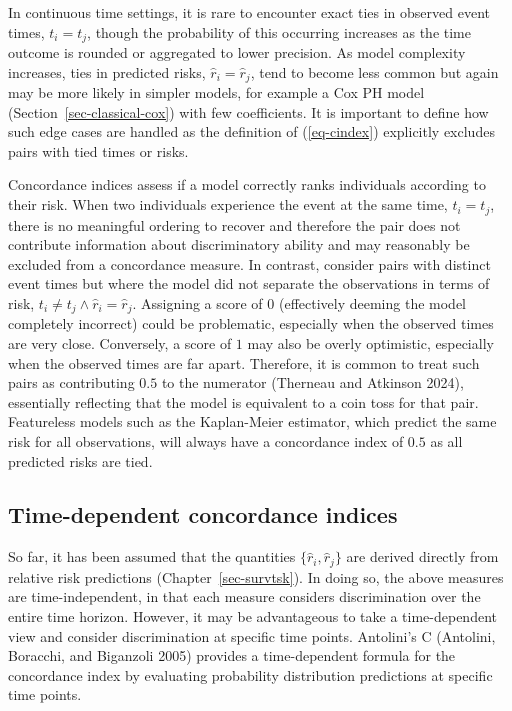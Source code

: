 \documentclass[
  letterpaper,
  krantz2]{style/krantz}
\begin{document}
In continuous time settings, it is rare to encounter exact
ties in observed event times, \(t_i = t_j\), though the
probability of this occurring increases as the time outcome is rounded
or aggregated to lower precision. As model complexity increases, ties in
predicted risks, \(\hat{r}_i = \hat{r}_j\), tend to become less common
but again may be more likely in simpler models, for example a Cox PH
model (Section~\ref{sec-classical-cox}) with
few coefficients. It is important to define how such edge cases are
handled as the definition of (\ref{eq-cindex}) explicitly excludes pairs
with tied times or risks.

Concordance indices assess if a model correctly ranks individuals
according to their risk. When two individuals experience the event at
the same time, \(t_i = t_j\), there is no meaningful ordering to recover
and therefore the pair does not contribute information about
discriminatory ability and may reasonably be excluded from a concordance
measure. In contrast, consider pairs with distinct event times but where
the model did not separate the observations in terms of risk,
\(t_i \neq t_j \wedge \hat{r}_i = \hat{r}_j\). Assigning a score of
\(0\) (effectively deeming the model completely incorrect) could be
problematic, especially when the observed times are very close.
Conversely, a score of \(1\) may also be overly optimistic, especially
when the observed times are far apart. Therefore, it is common to treat
such pairs as contributing \(0.5\) to the numerator (Therneau and
Atkinson 2024), essentially reflecting that the model is equivalent to a
coin toss for that pair. Featureless models such as the Kaplan-Meier
estimator, which predict the same risk for all observations, will always
have a concordance index of \(0.5\) as all predicted risks are tied.

\subsection{Time-dependent concordance indices}\label{sec-cindex-dep}

So far, it has been assumed that the quantities
\(\{\hat{r}_i, \hat{r}_j\}\) are derived directly from relative risk
predictions (Chapter~\ref{sec-survtsk}). In doing so, the above measures
are time-independent, in that each measure considers discrimination over
the entire time horizon. However, it may be advantageous to take a
time-dependent view and consider discrimination at specific time points.
Antolini's C (Antolini, Boracchi,
and Biganzoli 2005) provides a
time-dependent formula for the
concordance index by evaluating probability distribution predictions at
specific time points.
\end{document}
